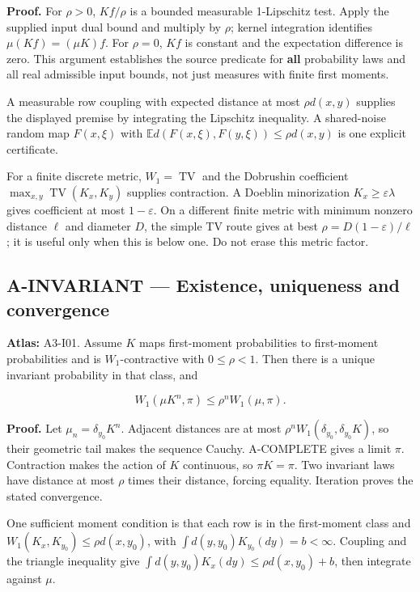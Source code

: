 \documentclass[
  11pt,
  a4paper,
]{article}
\begin{document}
\textbf{Proof.} For \(\rho>0\), \(Kf/\rho\) is a bounded measurable
1-Lipschitz test. Apply the supplied input dual bound and multiply by
\(\rho\); kernel integration identifies \(\mu(Kf)=(\mu K)f\). For
\(\rho=0\), \(Kf\) is constant and the expectation difference is zero.
This argument establishes the source predicate for \textbf{all}
probability laws and all real admissible input bounds, not just measures
with finite first moments.

A measurable row coupling with expected distance at most \(\rho d(x,y)\)
supplies the displayed premise by integrating the Lipschitz inequality.
A shared-noise random map \(F(x,\xi)\) with
\(\mathbb E d(F(x,\xi),F(y,\xi))\le\rho d(x,y)\) is one explicit
certificate.

For a finite discrete metric, \(W_1=\operatorname{TV}\) and the
Dobrushin coefficient \(\max_{x,y}\operatorname{TV}(K_x,K_y)\) supplies
contraction. A Doeblin minorization \(K_x\ge\varepsilon\lambda\) gives
coefficient at most \(1-\varepsilon\). On a different finite metric with
minimum nonzero distance \(\ell\) and diameter \(D\), the simple TV
route gives at best \(\rho=D(1-\varepsilon)/\ell\); it is useful only
when this is below one. Do not erase this metric factor.

\subsection{A-INVARIANT --- Existence, uniqueness and
convergence}\label{a-invariant-existence-uniqueness-and-convergence}

\textbf{Atlas:} A3-I01. Assume \(K\) maps first-moment probabilities to
first-moment probabilities and is \(W_1\)-contractive with
\(0\le\rho<1\). Then there is a unique invariant probability in that
class, and

\[W_1(\mu K^n,\pi)\le\rho^nW_1(\mu,\pi).\]

\textbf{Proof.} Let \(\mu_n=\delta_{y_0}K^n\). Adjacent distances are at
most \(\rho^nW_1(\delta_{y_0},\delta_{y_0}K)\), so their geometric tail
makes the sequence Cauchy. A-COMPLETE gives a limit \(\pi\). Contraction
makes the action of \(K\) continuous, so \(\pi K=\pi\). Two invariant
laws have distance at most \(\rho\) times their distance, forcing
equality. Iteration proves the stated convergence.

One sufficient moment condition is that each row is in the first-moment
class and \(W_1(K_x,K_{y_0})\le\rho d(x,y_0)\), with
\(\int d(y,y_0)K_{y_0}(dy)=b<\infty\). Coupling and the triangle
inequality give \(\int d(y,y_0)K_x(dy)\le\rho d(x,y_0)+b\), then
integrate against \(\mu\).
\end{document}
